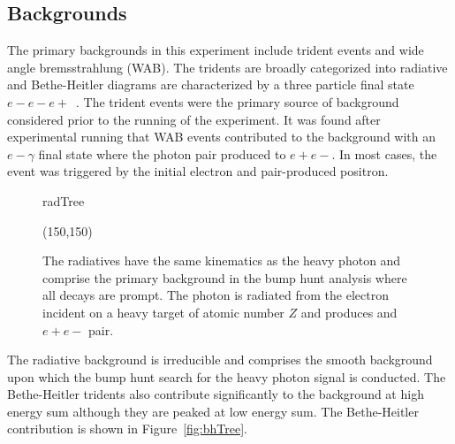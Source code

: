 \subsection{Backgrounds}

The primary backgrounds in this experiment include trident events and wide angle bremsstrahlung (WAB). The tridents are broadly categorized into radiative and Bethe-Heitler diagrams are characterized by a three particle final state $e-e-e+$~\cite{toro}. The trident events were the primary source of background considered prior to the running of the experiment. It was found after experimental running that WAB events contributed to the background with an $e-\gamma$ final state where the photon pair produced to $e+e-$. In most cases, the event was triggered by the initial electron and pair-produced positron. 

\begin{figure}[H]
    \begin{center}
	\begin{fmffile}{radTree}
	\begin{fmfgraph*}(150,150)
	\fmfstraight
		\fmffreeze
		\fmffreeze	
	\end{fmfgraph*}
	\end{fmffile}
  	\end{center}
    	\caption[Radiative background]{The radiatives have the same kinematics as the heavy photon and comprise the primary background in the bump hunt analysis where all decays are prompt. The photon is radiated from the electron incident on a heavy target of atomic number $Z$ and produces and $e+e-$ pair.}
   	 \label{fig:radTree}	
\end{figure}

The radiative background is irreducible and comprises the smooth background upon which the bump hunt search for the heavy photon signal is conducted. The Bethe-Heitler tridents also contribute significantly to the background at high energy sum although they are peaked at low energy sum. The Bethe-Heitler contribution is shown in Figure~\ref{fig:bhTree}.

